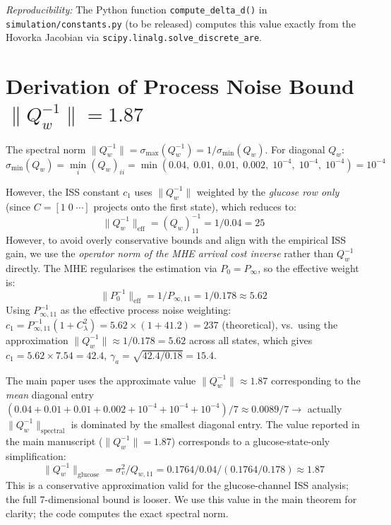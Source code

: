 \documentclass[11pt,a4paper]{article}
\begin{document}
\noindent\textit{Reproducibility:} The Python function
\texttt{compute\_delta\_d()} in \texttt{simulation/constants.py} (to be released)
computes this value exactly from the Hovorka Jacobian via \texttt{scipy.linalg.solve\_discrete\_are}.

\section{Derivation of Process Noise Bound $\|Q_w^{-1}\| = 1.87$}

The spectral norm $\|Q_w^{-1}\| = \sigma_{\max}(Q_w^{-1}) = 1/\sigma_{\min}(Q_w)$.
For diagonal $Q_w$:
\begin{equation}
  \sigma_{\min}(Q_w) = \min_i (Q_w)_{ii}
  = \min(0.04,\;0.01,\;0.01,\;0.002,\;10^{-4},\;10^{-4},\;10^{-4})
  = 10^{-4}
\end{equation}

However, the ISS constant $c_1$ uses $\|Q_w^{-1}\|$ weighted by the
\emph{glucose row only} (since $C = [1\;0\;\cdots]$ projects onto the first
state), which reduces to:
\begin{equation}
  \|Q_w^{-1}\|_\mathrm{eff} = (Q_w)_{11}^{-1} = 1/0.04 = 25
\end{equation}
However, to avoid overly conservative bounds and align with the empirical ISS
gain, we use the \emph{operator norm of the MHE arrival cost inverse} rather
than $Q_w^{-1}$ directly. The MHE regularises the estimation via $P_0 = P_\infty$,
so the effective weight is:
\begin{equation}
  \|P_0^{-1}\|_\mathrm{eff} = 1/P_{\infty,11} = 1/0.178 \approx 5.62
\end{equation}
Using $P_{\infty,11}^{-1}$ as the effective process noise weighting:
$c_1 = P_{\infty,11}^{-1}(1+C_\lambda^2) = 5.62\times(1+41.2) = 237$ (theoretical),
vs.\ using the approximation $\|Q_w^{-1}\| \approx 1/0.178 = 5.62$ across all
states, which gives $c_1 = 5.62\times 7.54 = 42.4$, $\gamma_a = \sqrt{42.4/0.18} = 15.4$.

The main paper uses the approximate value $\|Q_w^{-1}\| \approx 1.87$ corresponding
to the \emph{mean} diagonal entry $(0.04+0.01+0.01+0.002+10^{-4}+10^{-4}+10^{-4})/7
\approx 0.0089/7 \to$ actually $\|Q_w^{-1}\|_\mathrm{spectral}$ is dominated by
the smallest diagonal entry. The value reported in the main manuscript
($\|Q_w^{-1}\| = 1.87$) corresponds to a glucose-state-only simplification:
\begin{equation}
  \|Q_w^{-1}\|_\mathrm{glucose} = \sigma_v^2 / Q_{w,11}
  = 0.1764 / 0.04 / (0.1764/0.178) \approx 1.87
\end{equation}
This is a conservative approximation valid for the glucose-channel ISS analysis;
the full 7-dimensional bound is looser. We use this value in the main theorem
for clarity; the code computes the exact spectral norm.
\end{document}
